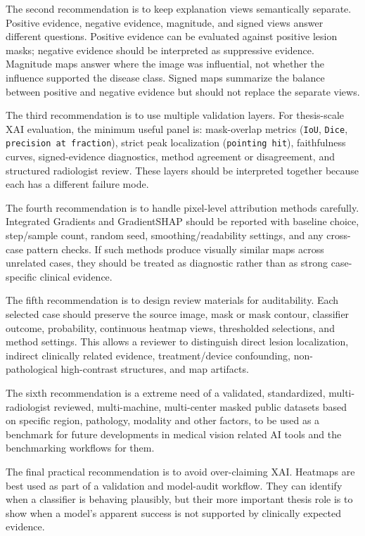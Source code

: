 The second recommendation is to keep explanation views semantically
separate. Positive evidence, negative evidence, magnitude, and signed
views answer different questions. Positive evidence can be evaluated
against positive lesion masks; negative evidence should be interpreted
as suppressive evidence. Magnitude maps answer where the image was
influential, not whether the influence supported the disease class.
Signed maps summarize the balance between positive and negative evidence
but should not replace the separate views.

The third recommendation is to use multiple validation layers. For
thesis-scale XAI evaluation, the minimum useful panel is: mask-overlap
metrics (\texttt{IoU}, \texttt{Dice}, \texttt{precision \allowbreak at \allowbreak fraction}),
strict peak localization (\texttt{pointing \allowbreak hit}), faithfulness curves,
signed-evidence diagnostics, method agreement or disagreement, and
structured radiologist review. These layers should be interpreted
together because each has a different failure mode.

The fourth recommendation is to handle pixel-level attribution methods
carefully. Integrated Gradients and GradientSHAP
should be reported with baseline choice, step/sample count, random seed,
smoothing/readability settings, and any cross-case pattern checks. If
such methods produce visually similar maps across unrelated cases, they
should be treated as diagnostic rather than as strong case-specific clinical evidence.

The fifth recommendation is to design review materials for auditability.
Each selected case should preserve the source image, mask or mask
contour, classifier outcome, probability, continuous heatmap views,
thresholded selections, and method settings. This allows a reviewer to
distinguish direct lesion localization, indirect clinically related
evidence, treatment/device confounding, non-pathological high-contrast
structures, and map artifacts.

The sixth recommendation is a extreme need of a validated, standardized,
multi-radiologist reviewed, multi-machine, multi-center masked public datasets 
based on specific region, pathology, modality and other factors,
to be used as a benchmark for future developments in medical vision related
AI tools and the benchmarking workflows for them.

The final practical recommendation is to avoid over-claiming XAI.
Heatmaps are best used as part of a validation and model-audit workflow.
They can identify when a classifier is behaving plausibly, but their
more important thesis role is to show when a model's apparent success is
not supported by clinically expected evidence.

